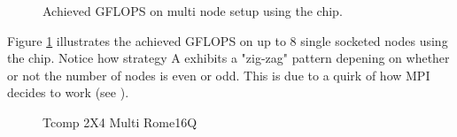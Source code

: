 \begin{figure}[H]
    \centering
    \caption{Achieved GFLOPS on multi node setup using the \romeq{} chip.}
    \label{fig:gflopsromemulti}
\end{figure}

Figure \ref{fig:gflopsromemulti} illustrates the achieved GFLOPS on up to 8 single socketed nodes using the \romeq{} chip. Notice how strategy A exhibits a "zig-zag" pattern depening on whether or not the number of nodes is even or odd. This is due to a quirk of how MPI decides to work (see \cite{10064025}).



\begin{figure}[H]
    \centering
    \caption{}
    \label{fig:tromemulti}
\end{figure}

\begin{figure}[H]
    \centering
    \caption{}
    \label{fig:tcommromemulti}
\end{figure}

\begin{figure}[H]
    \centering
    \caption{Tcomp 2X4 Multi Rome16Q}
    \label{fig:tcomp_2x4_multi_rome16q}
\end{figure}


\begin{figure}[H]
    \centering
    \caption{}
    \label{fig:commlaoadromemulti}
\end{figure}

